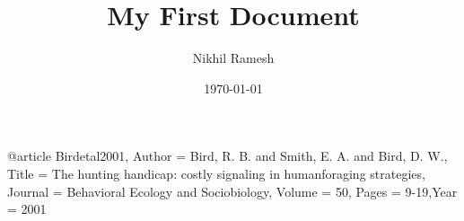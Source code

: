 \documentclass[a4paper,12pt]{article}
\begin{document}
\title{My First Document}
\author{Nikhil Ramesh}
\date{\today}
\maketitle

@article{
Birdetal2001,
	Author = {Bird, R. B. and Smith, E. A. and Bird, D. W.},
	Title = {The hunting handicap: costly signaling in humanforaging strategies},
	Journal = {Behavioral Ecology and Sociobiology},
	Volume = {50},
	Pages = {9-19},Year = {2001} }
\end{document}
